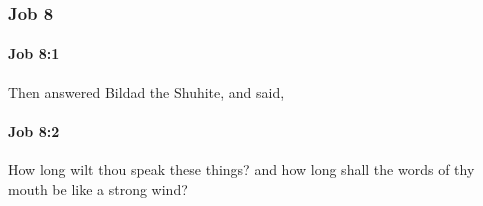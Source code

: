 	\subsubsection{Job 8} %
		\label{JOB-8}

		\paragraph{Job 8:1} %
			\label{JOB-8-1}

			Then answered Bildad the Shuhite, and said,


		\paragraph{Job 8:2} %
			\label{JOB-8-2}

			How long wilt thou speak these things? and how long shall the words of thy mouth be like a strong wind?

